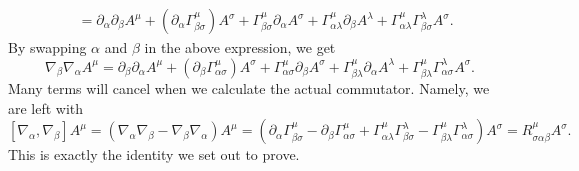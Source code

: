 \documentclass{../../templates/lkx_pset}
\begin{document}
\begin{solution}
\[\begin{aligned}
			 & =\partial_\alpha\partial_\beta A^\mu+ (\partial_\alpha\Gamma^\mu_{\beta\sigma})A^\sigma + \Gamma^\mu_{\beta\sigma}\partial_\alpha A^\sigma + \Gamma^\mu_{\alpha\lambda}\partial_\beta A^\lambda + \Gamma^\mu_{\alpha\lambda}\Gamma^\lambda_{\beta\sigma} A^\sigma.
		\end{aligned}
	\]
	By swapping $\alpha$ and $\beta$ in the above expression, we get
	\[
		\nabla_\beta\nabla_\alpha A^\mu
		=\partial_\beta\partial_\alpha A^\mu + (\partial_\beta\Gamma^\mu_{\alpha\sigma})A^\sigma + \Gamma^\mu_{\alpha\sigma}\partial_\beta A^\sigma + \Gamma^\mu_{\beta\lambda}\partial_\alpha A^\lambda + \Gamma^\mu_{\beta\lambda}\Gamma^\lambda_{\alpha\sigma} A^\sigma.
	\]
	Many terms will cancel when we calculate the actual commutator. Namely, we are left with
	\[
		[\nabla_\alpha, \nabla_\beta]A^\mu = (\nabla_\alpha\nabla_\beta - \nabla_\beta\nabla_\alpha)A^\mu = (\partial_\alpha\Gamma^\mu_{\beta\sigma} - \partial_\beta \Gamma^\mu_{\alpha\sigma} + \Gamma^\mu_{\alpha\lambda}\Gamma^\lambda_{\beta\sigma} - \Gamma^\mu_{\beta\lambda}\Gamma^\lambda_{\alpha\sigma}) A^\sigma = R_{\sigma\alpha\beta}^{\mu} A^\sigma.
	\]
	This is exactly the identity we set out to prove.
\end{solution}
\end{document}
